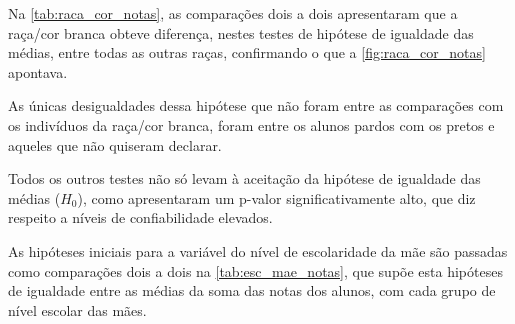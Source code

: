 Na \autoref{tab:raca_cor_notas}, as comparações dois a dois apresentaram que a raça/cor branca obteve diferença,
nestes testes de hipótese de igualdade das médias, entre todas as outras raças, confirmando o que a 
\autoref{fig:raca_cor_notas} apontava.

As únicas desigualdades dessa hipótese que não foram entre as comparações com os indivíduos da raça/cor branca,
foram entre os alunos pardos com os pretos e aqueles que não quiseram declarar.

Todos os outros testes não só levam à aceitação da hipótese de igualdade das médias ($H_0$), como apresentaram um p-valor
significativamente alto, que diz respeito a níveis de confiabilidade elevados.


As hipóteses iniciais para a variável do nível de escolaridade da mãe são passadas como comparações dois a dois na \autoref{tab:esc_mae_notas},
que supõe esta hipóteses de igualdade entre as médias da soma das notas dos alunos, com cada grupo de nível escolar das mães.
\newpage

